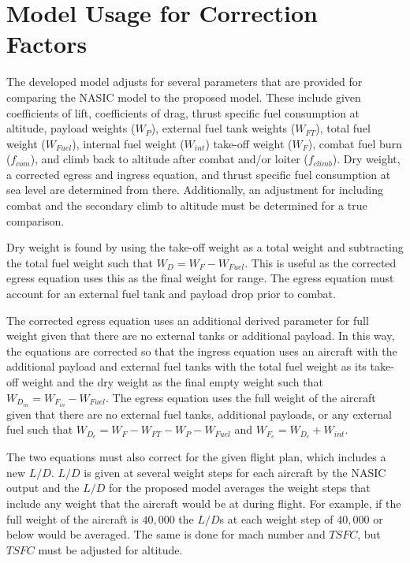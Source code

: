 \section{Model Usage for Correction Factors}
\label{section:modelUsage}
The developed model adjusts for several parameters that are provided for comparing the NASIC model to the proposed model. These include given coefficients of lift, coefficients of drag, thrust specific fuel consumption at altitude, payload weights ($W_P$), external fuel tank weights ($W_{FT}$), total fuel weight ($W_{Fuel}$), internal fuel weight ($W_{int}$) take-off weight ($W_F$), combat fuel burn ($f_{com}$), and climb back to altitude after combat and/or loiter ($f_{climb}$). Dry weight, a corrected egress and ingress equation, and thrust specific fuel consumption at sea level are determined from there. Additionally, an adjustment for including combat and the secondary climb to altitude must be determined for a true comparison.\par
Dry weight is found by using the take-off weight as a total weight and subtracting the total fuel weight such that $W_D = W_F - W_{Fuel}$. This is useful as the corrected egress equation uses this as the final weight for range. The egress equation must account for an external fuel tank and payload drop prior to combat.\par
The corrected egress equation uses an additional derived parameter for full weight given that there are no external tanks or additional payload. In this way, the equations are corrected so that the ingress equation uses an aircraft with the additional payload and external fuel tanks with the total fuel weight as its take-off weight and the dry weight as the final empty weight such that $W_{D_{in}} = W_{F_{in}}-W_{Fuel}$. The egress equation uses the full weight of the aircraft given that there are no external fuel tanks, additional payloads, or any external fuel such that $W_{D_{e}} = W_F-W_{FT}-W_P - W_{Fuel}$ and $W_{F_{e}} = W_{D_{e}} + W_{int}$. \par
The two equations must also correct for the given flight plan, which includes a new $L/D$. $L/D$ is given at several weight steps for each aircraft by the NASIC output and the $L/D$ for the proposed model averages the weight steps that include any weight that the aircraft would be at during flight. For example, if the full weight of the aircraft is $40,000$ the $L/D$s at each weight step of $40,000$ or below would be averaged. The same is done for mach number and $TSFC$, but $TSFC$ must be adjusted for altitude.\par
